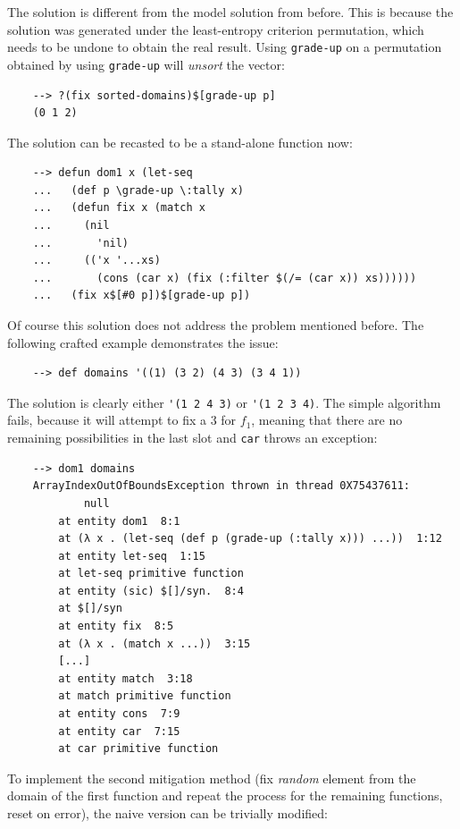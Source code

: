 The solution is different from the model solution from before. This is because the solution was generated under the least-entropy criterion permutation, which needs to be undone to obtain the real result. Using \verb|grade-up| on a permutation obtained by using \verb|grade-up| will \textit{unsort} the vector:

\begin{Verbatim}
    --> ?(fix sorted-domains)$[grade-up p]
    (0 1 2)
\end{Verbatim}

The solution can be recasted to be a stand-alone function now:

\begin{Verbatim}
    --> defun dom1 x (let-seq
    ...   (def p \grade-up \:tally x)
    ...   (defun fix x (match x
    ...     (nil
    ...       'nil)
    ...     (('x '...xs)
    ...       (cons (car x) (fix (:filter $(/= (car x)) xs))))))
    ...   (fix x$[#0 p])$[grade-up p])
\end{Verbatim}

Of course this solution does not address the problem mentioned before. The following crafted example demonstrates the issue:

\begin{Verbatim}
    --> def domains '((1) (3 2) (4 3) (3 4 1))
\end{Verbatim}

The solution is clearly either \verb|'(1 2 4 3)| or \verb|'(1 2 3 4)|. The simple algorithm fails, because it will attempt to fix a $3$ for $f_1$, meaning that there are no remaining possibilities in the last slot and \verb|car| throws an exception:

\begin{Verbatim}
    --> dom1 domains
    ArrayIndexOutOfBoundsException thrown in thread 0X75437611:
            null
        at entity dom1  8:1
        at (λ x . (let-seq (def p (grade-up (:tally x))) ...))  1:12
        at entity let-seq  1:15
        at let-seq primitive function
        at entity (sic) $[]/syn.  8:4
        at $[]/syn
        at entity fix  8:5
        at (λ x . (match x ...))  3:15
        [...]
        at entity match  3:18
        at match primitive function
        at entity cons  7:9
        at entity car  7:15
        at car primitive function
\end{Verbatim}

To implement the second mitigation method (fix \textit{random} element from the domain of the first function and repeat the process for the remaining functions, reset on error), the naive version can be trivially modified:

